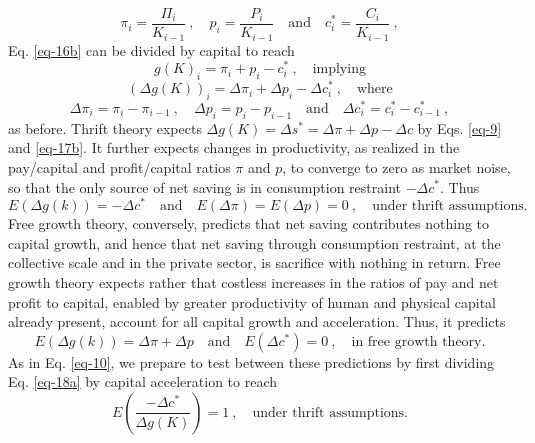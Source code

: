 \documentclass[a4paper,fleqn]{latex_styles/cas-sc}
\begin{document}
%
\begin{equation*}
\pi_i = \frac{\Pi_i}{K_{i - 1}} \ , \quad p_i = \frac{P_i}{K_{i-1}} \quad \text{and} \quad c^*_i = \frac{C_i}{K_{i-1}}\ ,
\end{equation*}
%
Eq. \eqref{eq-16b} can be divided by capital to reach
%
\begin{equation}
    g(K)_i = \pi_i + p_i - c^*_i\ , \quad \text{implying} \label{eq-16}
\end{equation}
\vspace{-5ex}
\begin{equation}
    (\Delta g(K))_i = \Delta \pi_i + \Delta p_i - \Delta c^*_i\ ,\quad \text{where}\label{eq-17a}
\end{equation}
\begin{equation*}
    \Delta \pi_i = \pi_i - \pi_{i - 1} \ , \quad \Delta p_i = p_i - p_{i - 1} \quad \text{and} \quad \Delta c^*_i = c^*_i - c^*_{i - 1}\ ,
\end{equation*}
%
as before. Thrift theory expects \(\Delta g(K) = \Delta s^* = \Delta \pi + \Delta p - \Delta c\) by Eqs. \eqref{eq-9} and \eqref{eq-17b}.
    It further expects changes in productivity, as realized in the pay/capital and profit/capital ratios \(\pi\) and \(p\), to converge to zero as market noise, so that the only source of net saving is in consumption restraint \(- \Delta c^*\). Thus
%
\begin{equation}
    E(\Delta g(k)) = - \Delta c^* \quad \text{and} \quad E(\Delta \pi) = E(\Delta p) = 0\ , \quad \text{under thrift assumptions.}\label{eq-18a}
\end{equation}
%
Free growth theory, conversely, predicts that net saving contributes nothing to capital growth, and hence that net saving through consumption restraint, at the collective scale and in the private sector, is sacrifice with nothing in return. Free growth theory expects rather that costless increases in the ratios of pay and net profit to capital, enabled by greater productivity of human and physical capital already present, account for all capital growth and acceleration. Thus, it predicts
%
\begin{equation}
    E(\Delta g(k)) = \Delta \pi + \Delta p \quad \text{and} \quad E(\Delta c^*) = 0 \ , \quad \text{in free growth theory.} \label{eq-19b}
\end{equation}
%
As in Eq. \eqref{eq-10}, we prepare to test between these predictions by first dividing Eq. \eqref{eq-18a} by capital acceleration to reach
% 
\begin{equation}
    E(\frac{- \Delta c^{*}}{ \Delta g(K)}) = 1\ ,\quad \text{under thrift assumptions.}\label{eq-17}
\end{equation}
\end{document}
